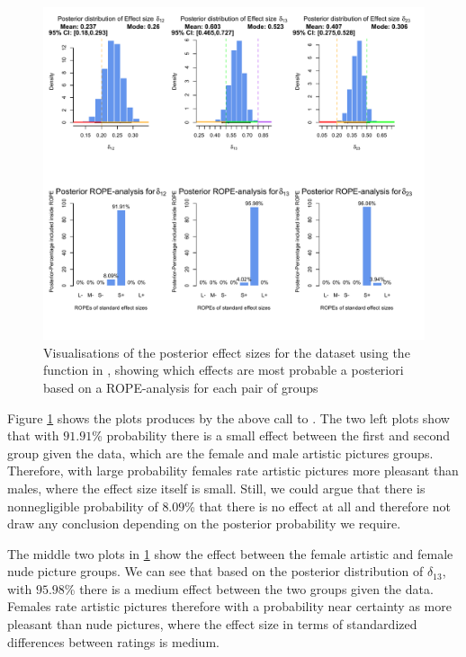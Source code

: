 \begin{figure}[h!]
\centering
\includegraphics[width=1\textwidth]{histFL2}
\caption{Visualisations of the posterior effect sizes for the  dataset using the  function in , showing which effects are most probable a posteriori based on a ROPE-analysis for each pair of groups}
\label{fig:plotFL1}
\end{figure}
Figure \ref{fig:plotFL1} shows the plots produces by the above call to . The two left plots show that with $91.91$\% probability there is a small effect between the first and second group given the data, which are the female and male artistic pictures groups. Therefore, with large probability females rate artistic pictures more pleasant than males, where the effect size itself is small. Still, we could argue that there is nonnegligible probability of $8.09$\% that there is no effect at all and therefore not draw any conclusion depending on the posterior probability we require. 

The middle two plots in  \ref{fig:plotFL1} show the effect between the female artistic and female nude picture groups. We can see that based on the posterior distribution of $\delta_{13}$, with $95.98$\% there is a medium effect between the two groups given the data. Females rate artistic pictures therefore with a probability near certainty as more pleasant than nude pictures, where the effect size in terms of standardized differences between ratings is medium.

